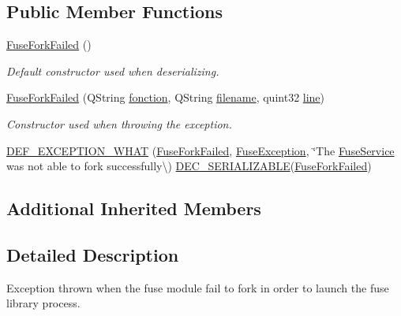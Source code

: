 \subsection*{Public Member Functions}
\begin{DoxyCompactItemize}
\item 
\hyperlink{class_gost_crypt_1_1_fuse_driver_1_1_fuse_fork_failed_a19664cc8a22485f3b103b2908f945521}{Fuse\+Fork\+Failed} ()
\begin{DoxyCompactList}\small\item\em Default constructor used when deserializing. \end{DoxyCompactList}\item 
\hyperlink{class_gost_crypt_1_1_fuse_driver_1_1_fuse_fork_failed_a348dd0bb305d832a68765dd36937c720}{Fuse\+Fork\+Failed} (Q\+String \hyperlink{class_gost_crypt_1_1_gost_crypt_exception_a29b8c93d5efbb1ff369107385725a939}{fonction}, Q\+String \hyperlink{class_gost_crypt_1_1_gost_crypt_exception_a749a12375f4ba9d502623b99d8252f38}{filename}, quint32 \hyperlink{class_gost_crypt_1_1_gost_crypt_exception_abf506d911f12a4e969eea500f90bd32c}{line})
\begin{DoxyCompactList}\small\item\em Constructor used when throwing the exception. \end{DoxyCompactList}\item 
\hyperlink{class_gost_crypt_1_1_fuse_driver_1_1_fuse_fork_failed_ada49ea4bb4fffacc04953d5ec092000d}{D\+E\+F\+\_\+\+E\+X\+C\+E\+P\+T\+I\+O\+N\+\_\+\+W\+H\+AT} (\hyperlink{class_gost_crypt_1_1_fuse_driver_1_1_fuse_fork_failed}{Fuse\+Fork\+Failed}, \hyperlink{class_gost_crypt_1_1_fuse_driver_1_1_fuse_exception}{Fuse\+Exception}, \char`\"{}The \hyperlink{class_gost_crypt_1_1_fuse_driver_1_1_fuse_service}{Fuse\+Service} was not able to fork successfully\textbackslash{}) \hyperlink{class_gost_crypt_1_1_fuse_driver_1_1_fuse_exception_a9e484bd1c55627664542200c8ff2d291}{D\+E\+C\+\_\+\+S\+E\+R\+I\+A\+L\+I\+Z\+A\+B\+LE}(\hyperlink{class_gost_crypt_1_1_fuse_driver_1_1_fuse_fork_failed}{Fuse\+Fork\+Failed})
\end{DoxyCompactItemize}
\subsection*{Additional Inherited Members}


\subsection{Detailed Description}
Exception thrown when the fuse module fail to fork in order to launch the fuse library process. 

